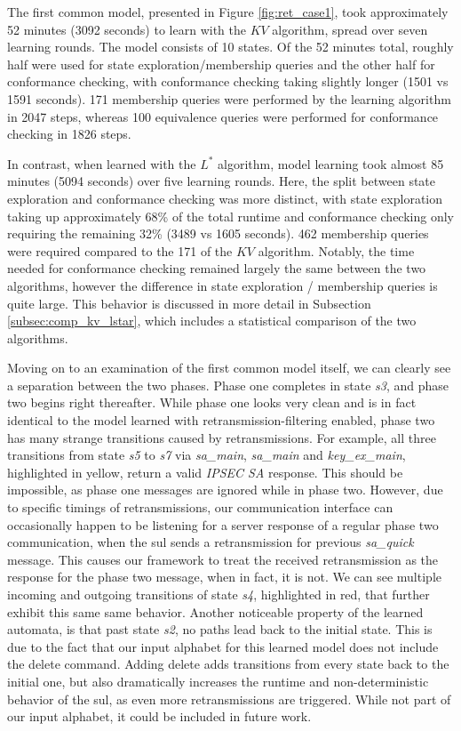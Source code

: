 The first common model, presented in Figure \ref{fig:ret_case1}, took approximately 52 minutes (3092 seconds) to learn with the $KV$ algorithm, spread over seven learning rounds. The model consists of 10 states. Of the 52 minutes total, roughly half were used for state exploration/membership queries and the other half for conformance checking, with conformance checking taking slightly longer (1501 vs 1591 seconds). 171 membership queries were performed by the learning algorithm in 2047 steps, whereas 100 equivalence queries were performed for conformance checking in 1826 steps.

In contrast, when learned with the $L^*$ algorithm, model learning took almost 85 minutes (5094 seconds) over five learning rounds. Here, the split between state exploration and conformance checking was more distinct, with state exploration taking up approximately 68\% of the total runtime and conformance checking only requiring the remaining 32\% (3489 vs 1605 seconds). 462 membership queries were required compared to the 171 of the $KV$ algorithm. Notably, the time needed for conformance checking remained largely the same between the two algorithms, however the difference in state exploration / membership queries is quite large. This behavior is discussed in more detail in Subsection \ref{subsec:comp_kv_lstar}, which includes a statistical comparison of the two algorithms.

Moving on to an examination of the first common model itself, we can clearly see a separation between the two phases. Phase one completes in state \emph{s3}, and phase two begins right thereafter. While phase one looks very clean and is in fact identical to the model learned with retransmission-filtering enabled, phase two has many strange transitions caused by retransmissions. For example, all three transitions from state \emph{s5} to \emph{s7} via \emph{sa\_main}, \emph{sa\_main} and \emph{key\_ex\_main}, highlighted in yellow, return a valid \emph{IPSEC SA} response. This should be impossible, as phase one messages are ignored while in phase two. However, due to specific timings of retransmissions, our communication interface can occasionally happen to be listening for a server response of a regular phase two communication, when the \ac{sul} sends a retransmission for previous \emph{sa\_quick} message. This causes our framework to treat the received retransmission as the response for the phase two message, when in fact, it is not. We can see multiple incoming and outgoing transitions of state \emph{s4}, highlighted in red, that further exhibit this same same behavior.
Another noticeable property of the learned automata, is that past state \emph{s2}, no paths lead back to the initial state. This is due to the fact that our input alphabet for this learned model does not include the delete command. Adding delete adds transitions from every state back to the initial one, but also dramatically increases the runtime and non-deterministic behavior of the \ac{sul}, as even more retransmissions are triggered. While not part of our input alphabet, it could be included in future work.

